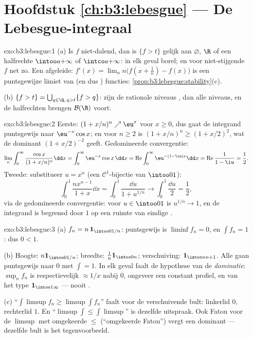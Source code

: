 \section*{Hoofdstuk \ref{ch:b3:lebesgue} --- De
Lebesgue-integraal}

\begin{solution}{exo:b3:lebesgue:1}
(a) Is $f$ niet-dalend, dan is $\{f > t\}$ gelijk aan
$\varnothing$, $\R$ of een halfrechte $\intoo a{+\infty}$ of
$\intco a{+\infty}$: in elk geval borel; en voor niet-stijgende
$f$ net zo. Een afgeleide: $f'(x) = \lim_n n\bigl(f(x + \frac1n)
- f(x)\bigr)$ is een puntsgewijze limiet van  (en dus
) functies: \cref{prop:b3:lebesgue:stability}(c).

(b) $\{f > t\} = \bigcup_{q \in \Q,\, q > t}\{f > q\}$: zijn de
rationale niveaus , dan alle niveaus, en de halfrechten
brengen $\mathcal B(\R)$ voort.
\end{solution}

\begin{solution}{exo:b3:lebesgue:2}
Eerste: $(1 + x/n)^n \nearrow \eu^x$ voor $x \geq 0$, dus gaat de
integrand puntsgewijs naar $\eu^{-x}\cos x$; en voor $n \geq 2$ is
$(1 + x/n)^n \geq (1 + x/2)^2$, wat de  dominant $(1
+ x/2)^{-2}$ geeft. Gedomineerde convergentie:
\[
\lim_n\int_0^\infty\frac{\cos x}{(1 + x/n)^n}\dd x
= \int_0^\infty \eu^{-x}\cos x\,\dd x
= \operatorname{Re}\int_0^\infty\eu^{-(1 - \iu)x}\dd x
= \operatorname{Re}\frac{1}{1 - \iu} = \frac12 .
\]
Tweede: substitueer $u = x^n$ (een $\mathcal C^1$-bijectie van
$\intoo01$):
\[
\int_0^1\frac{nx^{n-1}}{1 + x}\dd x = \int_0^1\frac{\dd u}{1 +
u^{1/n}} \longrightarrow \int_0^1\frac{\dd u}{2} = \frac12,
\]
via de gedomineerde convergentie: voor $u \in \intoo01$ is
$u^{1/n} \to 1$, en de integrand is begrensd door $1$ op een
ruimte van eindige .
\end{solution}

\begin{solution}{exo:b3:lebesgue:3}
(a) $f_n = n\,\mathbf 1_{\intoo0{1/n}}$: puntsgewijs is $\liminf
f_n = 0$, en $\int f_n = 1$: dus $0 < 1$.

(b) Hoogte: $n\mathbf 1_{\intoo0{1/n}}$; breedte: $\frac1n\mathbf
1_{\intoo0n}$; verschuiving: $\mathbf 1_{\intoo n{n+1}}$. Alle
gaan puntsgewijs naar $0$ met $\int = 1$. In elk geval faalt de
hypothese van de \emph{dominatie}: $\sup_nf_n$ is respectievelijk
$\approx 1/x$ nabij $0$, ongeveer een  constant
profiel, en van het type $\mathbf 1_{\intoo1\infty}$ --- nooit
.

(c) ``$\int\limsup f_n \geq \limsup\int f_n$'' faalt voor de
verschuivende bult: linkerlid $0$, rechterlid $1$. En
``$\limsup\int \leq \int\limsup$'' is dezelfde uitspraak. Ook
Fatou voor de $\limsup$ met omgekeerde $\leq$ (``omgekeerde
Fatou'') vergt een dominant --- dezelfde bult is het
tegenvoorbeeld.
\end{solution}

